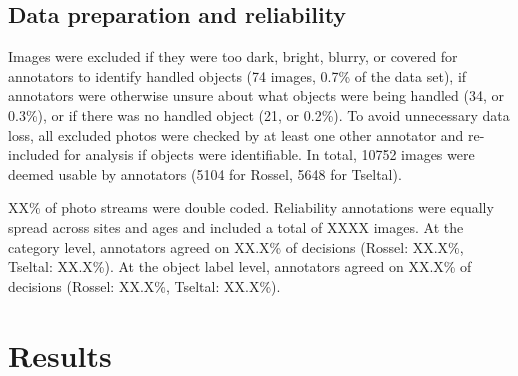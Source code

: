 \documentclass[10pt, letterpaper]{article}
\begin{document}
\hypertarget{data-preparation-and-reliability}{%
\subsection{Data preparation and
reliability}\label{data-preparation-and-reliability}}

Images were excluded if they were too dark, bright, blurry, or covered
for annotators to identify handled objects (74 images, 0.7\% of the data
set), if annotators were otherwise unsure about what objects were being
handled (34, or 0.3\%), or if there was no handled object (21, or
0.2\%). To avoid unnecessary data loss, all excluded photos were checked
by at least one other annotator and re-included for analysis if objects
were identifiable. In total, 10752 images were deemed usable by
annotators (5104 for Rossel, 5648 for Tseltal).

XX\% of photo streams were double coded. Reliability annotations were
equally spread across sites and ages and included a total of XXXX
images. At the category level, annotators agreed on XX.X\% of decisions
(Rossel: XX.X\%, Tseltal: XX.X\%). At the object label level, annotators
agreed on XX.X\% of decisions (Rossel: XX.X\%, Tseltal: XX.X\%).

\begin{table}[!ht]
\centering
{}
\caption{Non-study-related objects handled by the most children across categories and sites.} 
\label{tab:top-objects}
\end{table}

\hypertarget{results}{%
\section{Results}\label{results}}
\end{document}
